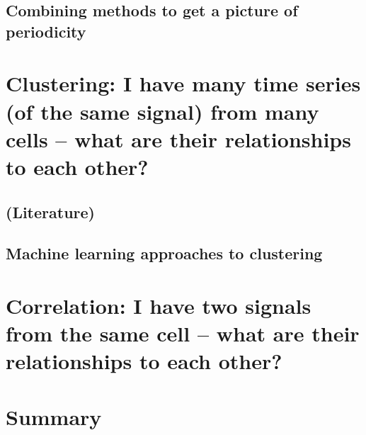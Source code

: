 \subsection{Combining methods to get a picture of periodicity}
\label{subsec:analysis-characterisation-combined}

\section{Clustering: I have many time series (of the same signal) from many cells -- what are their relationships to each other?}
\label{sec:analysis-clustering}

\subsection{(Literature)}
\label{subsec:analysis-clustering-literature}

\subsection{Machine learning approaches to clustering}
\label{subsec:analysis-clustering-ml}

\section{Correlation: I have two signals from the same cell -- what are their relationships to each other?}
\label{sec:analysis-correlation}

\section{Summary}
\label{sec:analysis-summary}
